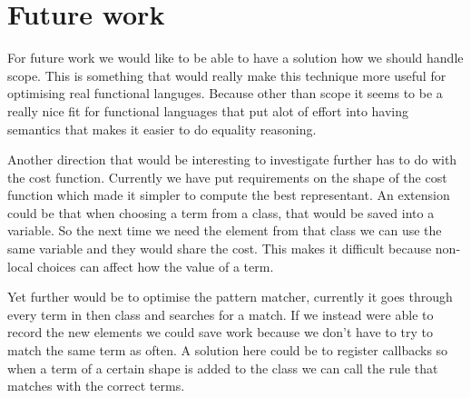 
\section{Future work}
For future work we would like to be able to have a solution how we should handle
scope. This is something that would really make this technique more useful for
optimising real functional languges. Because other than scope it seems to be a 
really nice fit for functional languages that put alot of effort into having semantics
that makes it easier to do equality reasoning.

Another direction that would be interesting to investigate further has to do with
the cost function. Currently we have put requirements on the shape of the cost function
which made it simpler to compute the best representant. An extension could be that
when choosing a term from a class, that would be saved into a variable. So the next
time we need the element from that class we can use the same variable and they would
share the cost. This makes it difficult because non-local choices can affect how
the value of a term.

Yet further would be to optimise the pattern matcher, currently it goes through 
every term in then class and searches for a match. If we instead were able to 
record the new elements we could save work because we don't have to try to match
the same term as often. A solution here could be to register callbacks so when a
term of a certain shape is added to the class we can call the rule that matches with
the correct terms.

 



